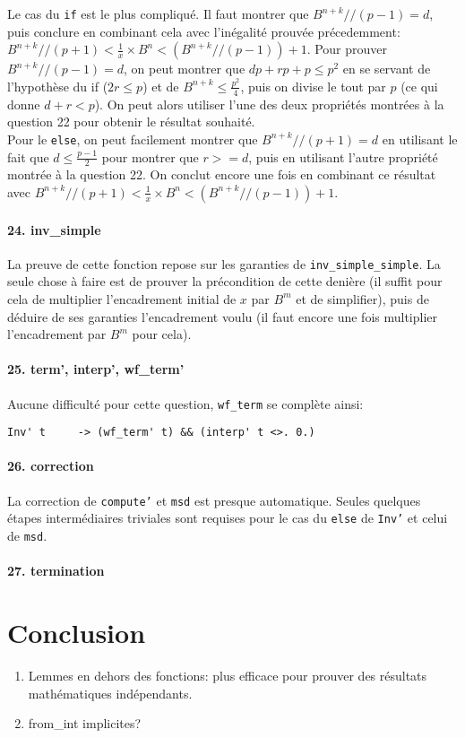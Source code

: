 \documentclass[a4paper]{article}%
\begin{document}
	Le cas du \texttt{if} est le plus compliqué. Il faut montrer que $B^{n+k} // (p-1) = d$,
	puis conclure en combinant cela avec l'inégalité prouvée précedemment: $B^{n+k} // (p+1) < \frac{1}{x} \times B^n < (B^{n+k} // (p-1)) + 1$.
	Pour prouver $B^{n+k} // (p-1) = d$, on peut montrer que $dp + rp + p \leq p^2$ en se servant de l'hypothèse du if
	($ 2r \leq p $) et de $B^{n+k} \leq \frac{p^2}{4}$, puis on divise le tout par $p$ (ce qui donne $d + r < p$). On peut alors
	utiliser l'une des deux propriétés montrées à la question 22 pour obtenir le résultat souhaité.\\

	Pour le \texttt{else}, on peut facilement montrer que $B^{n+k} // (p+1) = d$ en utilisant le fait que $d \leq \frac{p-1}{2}$
	pour montrer que $r >= d$, puis en utilisant l'autre propriété montrée à la question 22.
	On conclut encore une fois en combinant ce résultat avec $B^{n+k} // (p+1) < \frac{1}{x} \times B^n < (B^{n+k} // (p-1)) + 1$.

	\paragraph{24. inv\_simple} La preuve de cette fonction repose sur les garanties de \texttt{inv_simple_simple}.
	La seule chose à faire est de prouver la précondition de cette denière (il suffit pour cela de multiplier l'encadrement
	initial de $x$ par $B^m$ et de simplifier), puis de déduire de ses garanties l'encadrement voulu (il faut encore une fois
	multiplier l'encadrement par $B^m$ pour cela).

	\paragraph{25. term', interp', wf\_term'} Aucune difficulté pour cette question, \texttt{wf_term} se complète ainsi:
	\begin{verbatim}
Inv' t     -> (wf_term' t) && (interp' t <>. 0.)
	\end{verbatim}

	\paragraph{26. correction} La correction de \texttt{compute'} et \texttt{msd} est presque automatique.
	Seules quelques étapes intermédiaires triviales sont requises pour le cas du \texttt{else} de \texttt{Inv'}
	et celui de \texttt{msd}.

	\paragraph{27. termination}

	\section{Conclusion}
		
	\begin{enumerate}
		\item Lemmes en dehors des fonctions: plus efficace pour prouver des résultats mathématiques indépendants.
		\item from\_int implicites?
	\end{enumerate}
\end{document}
